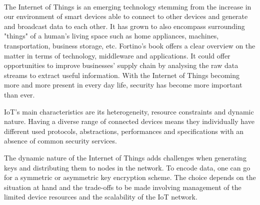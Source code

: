 \documentclass[14]{article}
\begin{document}
\author{\textbf{Faculty of Sciences and Bio-Engineering Sciences}\\[2\baselineskip]\newline\textbf{Arthur Chomé}}

\date{ \large Security within the Internet Of things: \break A Literature Review}
\title{\vspace{-6cm}}%

\maketitle\mbox{}\\

The Internet of Things is an emerging technology\cite{atzori2010internet} stemming from the increase in our environment of smart devices able to connect to other devices and generate and broadcast data to each other. It has grown to also encompass surrounding "things" of a human’s living space such as home appliances, machines, transportation, business storage, etc. Fortino's book\cite{fortino2014internet} offers a clear overview on the matter in terms of technology, middleware and applications. It could offer opportunities to improve businesses' supply chain\cite{ben2019internet} by analysing the raw data streams to extract useful information. With the Internet of Things becoming more and more present in every day life, security has become more important than ever. 
\newline

IoT's main characteristics\cite{oh2017security} are its heterogeneity, resource constraints and dynamic nature. Having a diverse range of connected devices means they individually have different used protocols\cite{sethi2017internet}, abstractions, performances and specifications with an absence of common security services.

The dynamic nature of the Internet of Things adds challenges when generating keys\cite{roman2011key} and distributing them to nodes in the network. To encode data, one can go for a symmetric\cite{gomes2014internet} or asymmetric key encryption scheme. The choice depends on the situation at hand and the trade-offs to be made involving management of the limited device resources\cite{katagi2008lightweight} and the scalability of the IoT network\cite{gomes2014internet}.
\end{document}
